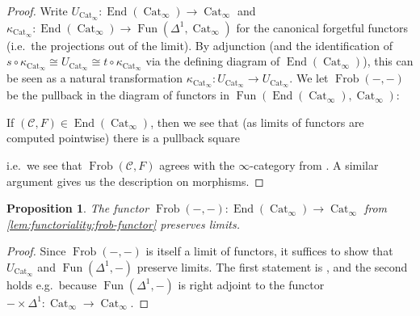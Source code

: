 \documentclass{article}
\theoremstyle{definition}
\theoremstyle{definition}
\theoremstyle{definition}
\theoremstyle{plain}
\theoremstyle{plain}
\theoremstyle{plain}
\theoremstyle{plain}
\theoremstyle{plain}
\theoremstyle{plain}
\newtheorem{prop}[defn]{Proposition}
\theoremstyle{plain}
\theoremstyle{plain}
\theoremstyle{remark}
\theoremstyle{remark}
\theoremstyle{plain}
\theoremstyle{plain}
\theoremstyle{plain}
\theoremstyle{plain}
\theoremstyle{plain}
\newcommand{\id}[1]{\operatorname{id}_{#1}}
\newcommand{\cartsymb}{\arrow[dr, phantom,"\scalebox{1.5}{\color{black}$\lrcorner$}", near start, color=black]}
\newcommand{\Frob}[2]{\operatorname{Frob}(#1, #2)}
\newcommand{\End}[1]{\operatorname{End}(#1)}
\newcommand{\Cat}[1]{\mathcal{#1}}
\newcommand{\Fun}[2]{\operatorname{Fun}({#1},{#2})}
\newcommand{\CatInf}{\operatorname{Cat}_{\infty}}
\begin{document}
\begin{proof}
    Write $U_{\CatInf} \colon \End{\CatInf} \to \CatInf$ and $\kappa_{\CatInf} \colon \End{\CatInf} \to \Fun{\Delta^1}{\CatInf}$ for the canonical forgetful functors
    (i.e.\ the projections out of the limit).
    By adjunction (and the identification of $s \circ \kappa_{\CatInf} \cong U_{\CatInf} \cong t \circ \kappa_{\CatInf}$ via the 
    defining diagram of $\End{\CatInf}$), this can be seen as a natural transformation $\kappa_{\CatInf} \colon U_{\CatInf} \to U_{\CatInf}$.
    We let $\Frob{-}{-}$ be the pullback in the diagram of functors in $\Fun{\End{\CatInf}}{\CatInf}$:
    \begin{center}
    \end{center}
    If $(\Cat C, F) \in \End{\CatInf}$, then we see that (as limits of functors are computed pointwise) there is a pullback square
    \begin{center}
    \end{center}
    i.e.\ we see that $\Frob{\Cat C}{F}$ agrees with the $\infty$-category 
    from \cite[Definition 2.4]{cartmod}.
    A similar argument gives us the description on morphisms.
\end{proof}

\begin{prop} \label{lem:functoriality:frob-functor-limits}
    The functor $\Frob{-}{-} \colon \End{\CatInf} \to \CatInf$ from \cref{lem:functoriality:frob-functor}
    preserves limits.
\end{prop}
\begin{proof}
    Since $\Frob{-}{-}$ is itself a limit of functors,
    it suffices to show that $U_{\CatInf}$ and $\Fun{\Delta^1}{-}$ preserve limits.
    The first statement is \cite[Proposition 2.6 (c)]{cartmod},
    and the second holds e.g.\ because $\Fun{\Delta^1}{-}$ is right adjoint to the functor $- \times \Delta^1 \colon \CatInf \to \CatInf$.
\end{proof}
\end{document}

